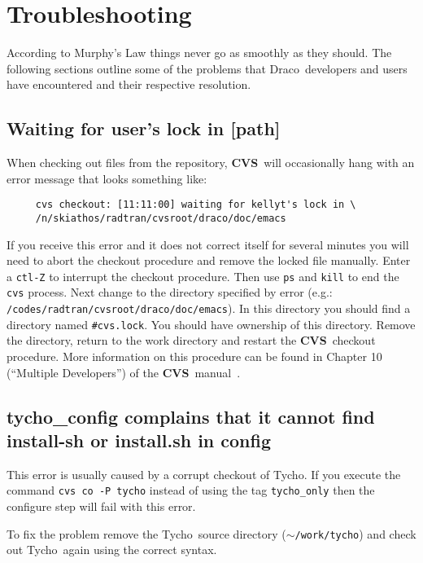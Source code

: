 \documentclass[10pt]{nmemo}
\newcommand{\comp}[1]{\normalfont\normalsize\texttt{#1}}
\newcommand{\draco}{{\normalfont\sffamily Draco}}
\newcommand{\tycho}{{\normalfont\sffamily Tycho}}
\newcommand{\cvs}{{\normalfont\bfseries CVS}}
\begin{document}
\section{Troubleshooting}

According to Murphy's Law things never go as smoothly as they should.
The following sections outline some of the problems that \draco\ 
developers and users have encountered and their respective resolution.

\subsection{Waiting for user's lock in [path]}

When checking out files from the repository, \cvs\ will occasionally
hang with an error message that looks something like:

\footnotesize
\begin{verbatim}
     cvs checkout: [11:11:00] waiting for kellyt's lock in \
     /n/skiathos/radtran/cvsroot/draco/doc/emacs
\end{verbatim}
\normalsize

If you receive this error and it does not correct itself for several
minutes you will need to abort the checkout procedure and remove the
locked file manually.  Enter a \comp{ctl-Z} to interrupt the checkout
procedure.  Then use \comp{ps} and \comp{kill} to end the \comp{cvs}
process.  Next change to the directory specified by error (e.g.:
\comp{/codes/radtran/cvsroot/draco/doc/emacs}).  In this
directory you should find a directory named \comp{\#cvs.lock}.  You
should have ownership of this directory.  Remove the directory, return
to the work directory and restart the \cvs\ checkout procedure.  More
information on this procedure can be found in Chapter 10 (``Multiple
Developers'') of the \cvs\ manual~\cite{cvs}.

\subsection{tycho\_config complains that it cannot find
  install-sh or install.sh in config}

This error is usually caused by a corrupt checkout of \tycho.  If you
execute the command \comp{cvs~co~-P~tycho} instead of using the tag
\comp{tycho\_only} then the configure step will fail with this error.  

To fix the problem remove the \tycho\ source directory
(\comp{$\sim$/work/tycho}) and check out \tycho\ again using the
correct syntax.
\end{document}
